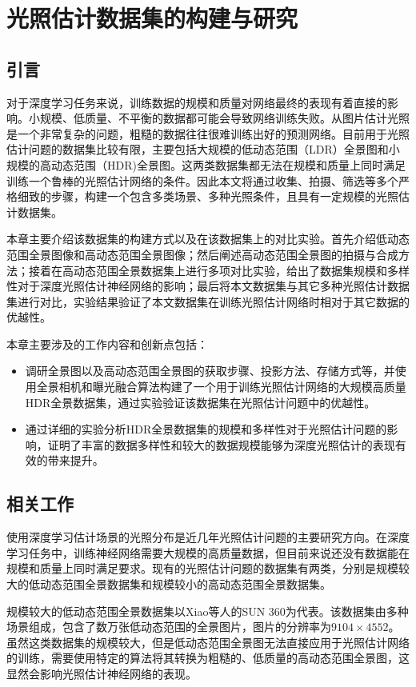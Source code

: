 \chapter{光照估计数据集的构建与研究}\label{chap:dataset}
\section{引言}
对于深度学习任务来说，训练数据的规模和质量对网络最终的表现有着直接的影响。小规模、低质量、不平衡的数据都可能会导致网络训练失败。从图片估计光照是一个非常复杂的问题，粗糙的数据往往很难训练出好的预测网络。目前用于光照估计问题的数据集比较有限，主要包括大规模的低动态范围（LDR）全景图和小规模的高动态范围（HDR)全景图。这两类数据集都无法在规模和质量上同时满足训练一个鲁棒的光照估计网络的条件。因此本文将通过收集、拍摄、筛选等多个严格细致的步骤，构建一个包含多类场景、多种光照条件，且具有一定规模的光照估计数据集。

本章主要介绍该数据集的构建方式以及在该数据集上的对比实验。首先介绍低动态范围全景图像和高动态范围全景图像；然后阐述高动态范围全景图的拍摄与合成方法；接着在高动态范围全景数据集上进行多项对比实验，给出了数据集规模和多样性对于深度光照估计神经网络的影响；最后将本文数据集与其它多种光照估计数据集进行对比，实验结果验证了本文数据集在训练光照估计网络时相对于其它数据的优越性。

本章主要涉及的工作内容和创新点包括：
\begin{itemize}
    \item 调研全景图以及高动态范围全景图的获取步骤、投影方法、存储方式等，并使用全景相机和曝光融合算法构建了一个用于训练光照估计网络的大规模高质量HDR全景数据集，通过实验验证该数据集在光照估计问题中的优越性。
    \item 通过详细的实验分析HDR全景数据集的规模和多样性对于光照估计问题的影响，证明了丰富的数据多样性和较大的数据规模能够为深度光照估计的表现有效的带来提升。
\end{itemize}
\section{相关工作}
使用深度学习估计场景的光照分布是近几年光照估计问题的主要研究方向。在深度学习任务中，训练神经网络需要大规模的高质量数据，但目前来说还没有数据能在规模和质量上同时满足要求。现有的光照估计问题的数据集有两类，分别是规模较大的低动态范围全景数据集和规模较小的高动态范围全景数据集。

规模较大的低动态范围全景数据集以Xiao等人的SUN 360\cite{xiao2012recognizing}为代表。该数据集由多种场景组成，包含了数万张低动态范围的全景图片，图片的分辨率为$9104\times4552$。虽然这类数据集的规模较大，但是低动态范围全景图无法直接应用于光照估计网络的训练，需要使用特定的算法将其转换为粗糙的、低质量的高动态范围全景图，这显然会影响光照估计神经网络的表现。

